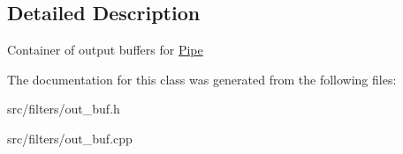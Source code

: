 \subsection{Detailed Description}
Container of output buffers for \hyperlink{classBotan_1_1Pipe}{Pipe} 

The documentation for this class was generated from the following files\-:\begin{DoxyCompactItemize}
\item 
src/filters/out\-\_\-buf.\-h\item 
src/filters/out\-\_\-buf.\-cpp\end{DoxyCompactItemize}
